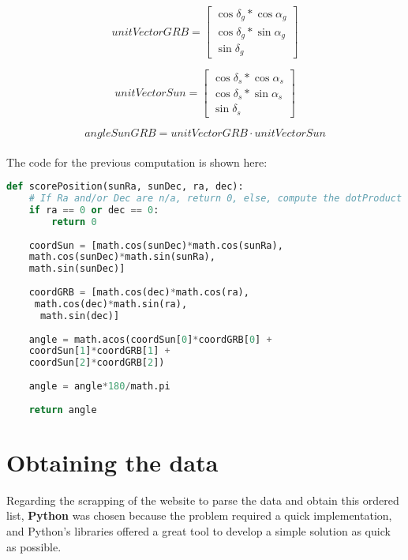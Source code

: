 \begin{equation} \label{eq:1}
	unitVectorGRB =	
	\begin{bmatrix}
	\cos\delta_{g} * \cos\alpha_{g} \\ 
	\cos\delta_{g} * \sin\alpha_{g} \\
	\sin\delta_{g}
	\end{bmatrix}
\end{equation}

\begin{equation} \label{eq:2}
	unitVectorSun =	
	\begin{bmatrix}
	\cos\delta_{s} * \cos\alpha_{s} \\ 
	\cos\delta_{s} * \sin\alpha_{s} \\
	\sin\delta_{s}
	\end{bmatrix}
\end{equation}

\begin{equation} \label{eq:3}
	angleSunGRB = unitVectorGRB \cdot unitVectorSun
\end{equation}\\

The code for the previous computation is shown here:\\

\begin{lstlisting}[language=Python, caption=Python function for computing the angle]
def scorePosition(sunRa, sunDec, ra, dec):
	# If Ra and/or Dec are n/a, return 0, else, compute the dotProduct
	if ra == 0 or dec == 0:
		return 0
	
	coordSun = [math.cos(sunDec)*math.cos(sunRa),
	math.cos(sunDec)*math.sin(sunRa), 
	math.sin(sunDec)]
	
	coordGRB = [math.cos(dec)*math.cos(ra),
	 math.cos(dec)*math.sin(ra),
	  math.sin(dec)]
	
	angle = math.acos(coordSun[0]*coordGRB[0] +
	coordSun[1]*coordGRB[1] +
	coordSun[2]*coordGRB[2])
	
	angle = angle*180/math.pi
	
	return angle
\end{lstlisting} 





\section{Obtaining the data}

Regarding the scrapping of the website to parse the data and obtain this ordered list, \textbf{Python} was chosen because the problem required a quick implementation, and Python’s libraries offered a great tool to develop a simple solution as quick as possible.

